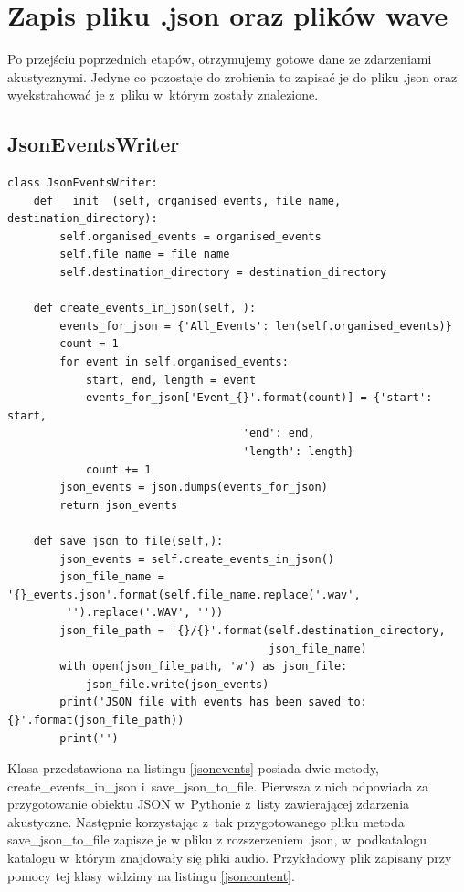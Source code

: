 \documentclass[eng,printmode]{mgr}
\begin{document}
\section{Zapis pliku .json oraz plików wave}
Po przejściu poprzednich etapów, otrzymujemy gotowe dane ze zdarzeniami akustycznymi. Jedyne co pozostaje do zrobienia to zapisać je do pliku .json oraz wyekstrahować je z~pliku w~którym zostały znalezione. 

\subsection{JsonEventsWriter}

\begin{minipage}{\linewidth}
\begin{lstlisting}[caption={fragment kodu źródłowego pliku JsonEventWriter.py,\newline klasa JsonEventsWriter},captionpos=b,label={jsonevents}] 
class JsonEventsWriter:
    def __init__(self, organised_events, file_name, destination_directory):
        self.organised_events = organised_events
        self.file_name = file_name
        self.destination_directory = destination_directory

    def create_events_in_json(self, ):
        events_for_json = {'All_Events': len(self.organised_events)}
        count = 1
        for event in self.organised_events:
            start, end, length = event
            events_for_json['Event_{}'.format(count)] = {'start': start, 
            						'end': end, 
            						'length': length}
            count += 1
        json_events = json.dumps(events_for_json)
        return json_events

    def save_json_to_file(self,):
        json_events = self.create_events_in_json()
        json_file_name = '{}_events.json'.format(self.file_name.replace('.wav',
         '').replace('.WAV', ''))
        json_file_path = '{}/{}'.format(self.destination_directory,
        								json_file_name)
        with open(json_file_path, 'w') as json_file:
            json_file.write(json_events)
        print('JSON file with events has been saved to: {}'.format(json_file_path))
        print('')
\end{lstlisting}
\end{minipage}

Klasa przedstawiona na listingu \ref{jsonevents} posiada dwie metody, create\_events\_in\_json i~save\_json\_to\_file. Pierwsza z nich odpowiada za przygotowanie obiektu JSON w~Pythonie z~listy zawierającej zdarzenia akustyczne. Następnie korzystając z~tak przygotowanego pliku metoda save\_json\_to\_file zapisze je w pliku z rozszerzeniem .json, w~podkatalogu katalogu w~którym znajdowały się pliki audio.  Przykładowy plik zapisany przy pomocy tej klasy widzimy na listingu \ref{jsoncontent}. 
\end{document}
